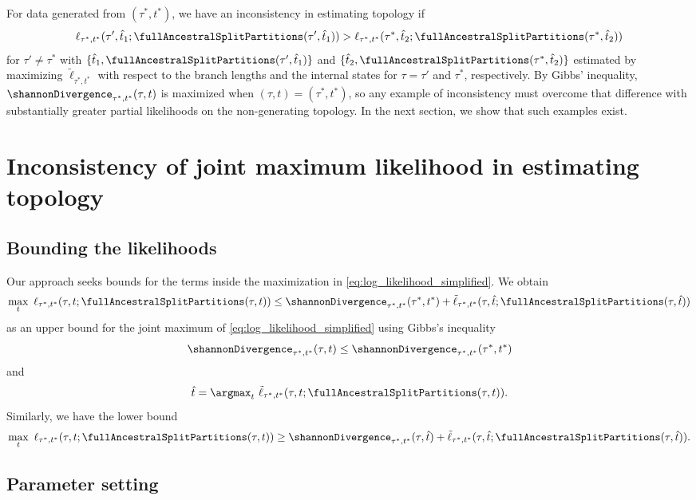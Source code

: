 For data generated from $(\tau^*, t^*)$, we have an inconsistency in estimating topology if
\begin{equation}
\label{eq:inconsistency_inequality}
\ell_{\tau^*,t^*}(\tau', \hat{t}_1; \fullAncestralSplitPartitions(\tau', \hat{t}_1)) > \ell_{\tau^*,t^*}(\tau^*, \hat{t}_2; \fullAncestralSplitPartitions(\tau^*, \hat{t}_2))
\end{equation}
for $\tau'\neq\tau^*$ with $\{\hat{t}_1,\fullAncestralSplitPartitions(\tau', \hat{t}_1)\}$ and $\{\hat{t}_2,\fullAncestralSplitPartitions(\tau^*, \hat{t}_2)\}$ estimated by maximizing $\tilde{\ell}_{\tau^*,t^*}$ with respect to the branch lengths and the internal states for $\tau = \tau'$ and $\tau^*$, respectively.
By Gibbs' inequality, $\shannonDivergence_{\tau^*,t^*}(\tau,t)$ is maximized when $(\tau,t) = (\tau^*,t^*)$, so any example of inconsistency must overcome that difference with substantially greater partial likelihoods on the non-generating topology.
In the next section, we show that such examples exist.

\section{Inconsistency of joint maximum likelihood in estimating topology}

\subsection{Bounding the likelihoods}

Our approach seeks bounds for the terms inside the maximization in \eqref{eq:log_likelihood_simplified}.
We obtain
$$
\max_{t} \ \ell_{\tau^*,t^*}(\tau, t; \fullAncestralSplitPartitions(\tau,t)) \le
    \shannonDivergence_{\tau^*,t^*}(\tau^*,t^*)
    + \tilde{\ell}_{\tau^*,t^*}(\tau, \hat{t}; \fullAncestralSplitPartitions(\tau, \hat{t}))
$$
as an upper bound for the joint maximum of \eqref{eq:log_likelihood_simplified} using Gibbs's inequality
$$
\shannonDivergence_{\tau^*,t^*}(\tau,t) \le \shannonDivergence_{\tau^*,t^*}(\tau^*,t^*)
$$
and
$$
\hat{t} = \argmax_{t} \ \tilde{\ell}_{\tau^*,t^*}(\tau, t; \fullAncestralSplitPartitions(\tau,t)).
$$
Similarly, we have the lower bound
$$
\max_{t} \ \ell_{\tau^*,t^*}(\tau, t; \fullAncestralSplitPartitions(\tau,t)) \ge
    \shannonDivergence_{\tau^*,t^*}(\tau,\hat{t})
    + \tilde{\ell}_{\tau^*,t^*}(\tau, \hat{t}; \fullAncestralSplitPartitions(\tau, \hat{t})).
$$

\subsection{Parameter setting}

